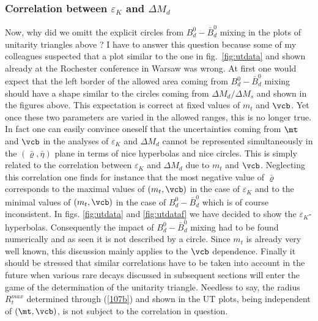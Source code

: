 \subsubsection{Correlation between $\varepsilon_K$ and $\Delta M_d$}
Now, why did we omitt the explicit circles from $B^0_d-\bar B^0_d$ mixing 
in the plots of unitarity triangles above ? I have to answer this
question because some of my colleagues suspected that a plot similar
to the one in fig.~\ref{fig:utdata} and shown already at the Rochester
conference in Warsaw was wrong. At first  one would expect that the
left border of the allowed area coming from $B^0_d-\bar B^0_d$ mixing
should have a shape similar to the circles coming from 
$\Delta M_d/\Delta M_s$ and shown in the figures above. This expectation
is correct at fixed values of $m_t$ and $\vcb$. Yet once these
two parameters are varied in the allowed ranges, this is no longer
true. In fact one can easily convince oneself that the uncertainties
coming from $\mt$ and $\vcb$ in the analyses of $\varepsilon_K$ and
$\Delta M_d$ cannot be represented simultaneously in the 
$(\bar\varrho,\bar\eta)$ plane in terms of nice hyperbolas
and nice circles. This is simply related to the correlation between
$\varepsilon_K$ and $\Delta M_d$ due to $m_t$ and $\vcb$. Neglecting
this correlation one finds for instance that the most negative value of 
$\bar\varrho$ corresponds to the maximal values of $(m_t,\vcb)$ in the
case of $\varepsilon_K$ and to the minimal values of $(m_t,\vcb)$ in the
case of $B^0_d-\bar B^0_d$ which is of course inconsistent. In 
figs. \ref{fig:utdata} and  \ref{fig:utdataf} we have decided
to show the $\varepsilon_K$-hyperbolas. Consequently the impact
of $B^0_d-\bar B^0_d$ mixing had to be found numerically and as
seen it is not described by a circle. Since $m_t$ is already
very well known, this discussion mainly applies to the $\vcb$ dependence.
Finally it should be stressed that similar correlations have to
be taken into account in the future when various rare decays discussed in
subsequent sections will enter the game of the determination of the
unitarity triangle. Needless to say, the radius $R^{max}_t$ 
determined through
(\ref{107b}) and shown in the UT plots, being independent of
$(\mt,\vcb)$, is not subject to the correlation in question.

